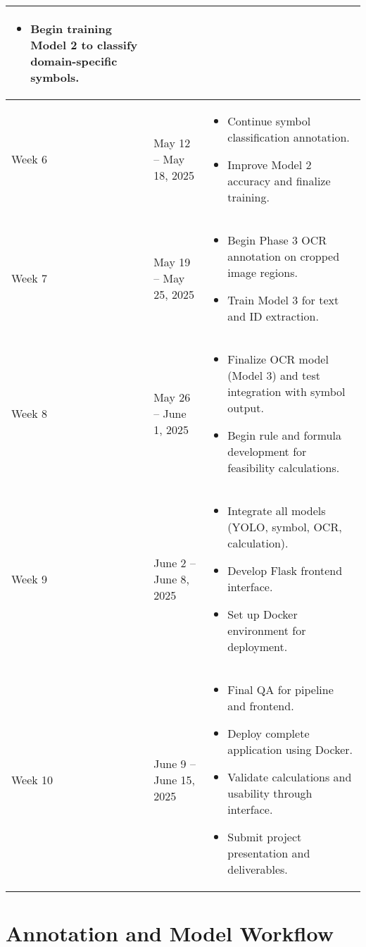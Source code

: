 \documentclass{article}
\begin{document}
\begin{longtable}{|p{2.5cm}|p{4.2cm}|p{8.5cm}|}
\begin{itemize}
    \item Begin training Model 2 to classify domain-specific symbols.
\end{itemize} \\
\hline
Week 6 & May 12 -- May 18, 2025 &
\begin{itemize}
    \item Continue symbol classification annotation.
    \item Improve Model 2 accuracy and finalize training.
\end{itemize} \\
\hline
Week 7 & May 19 -- May 25, 2025 &
\begin{itemize}
    \item Begin Phase 3 OCR annotation on cropped image regions.
    \item Train Model 3 for text and ID extraction.
\end{itemize} \\
\hline
Week 8 & May 26 -- June 1, 2025 &
\begin{itemize}
    \item Finalize OCR model (Model 3) and test integration with symbol output.
    \item Begin rule and formula development for feasibility calculations.
\end{itemize} \\
\hline
Week 9 & June 2 -- June 8, 2025 &
\begin{itemize}
    \item Integrate all models (YOLO, symbol, OCR, calculation).
    \item Develop Flask frontend interface.
    \item Set up Docker environment for deployment.
\end{itemize} \\
\hline
Week 10 & June 9 -- June 15, 2025 &
\begin{itemize}
    \item Final QA for pipeline and frontend.
    \item Deploy complete application using Docker.
    \item Validate calculations and usability through interface.
    \item Submit project presentation and deliverables.
\end{itemize} \\
\hline
\end{longtable}

\section*{Annotation and Model Workflow}
\end{document}
